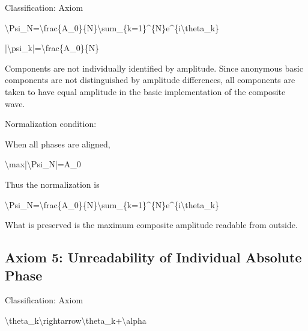 \documentclass[
  a4paper,
]{article}
\newenvironment{Shaded}{}{}
\newcommand{\NormalTok}[1]{#1}
\begin{document}
Classification: Axiom

\begin{Shaded}
\begin{Highlighting}[]
\NormalTok{\textbackslash{}Psi\_N=\textbackslash{}frac\{A\_0\}\{N\}\textbackslash{}sum\_\{k=1\}\^{}\{N\}e\^{}\{i\textbackslash{}theta\_k\}}
\end{Highlighting}
\end{Shaded}

\begin{Shaded}
\begin{Highlighting}[]
\NormalTok{|\textbackslash{}psi\_k|=\textbackslash{}frac\{A\_0\}\{N\}}
\end{Highlighting}
\end{Shaded}

Components are not individually identified by amplitude. Since anonymous
basic components are not distinguished by amplitude differences, all
components are taken to have equal amplitude in the basic implementation
of the composite wave.

Normalization condition:

When all phases are aligned,

\begin{Shaded}
\begin{Highlighting}[]
\NormalTok{\textbackslash{}max|\textbackslash{}Psi\_N|=A\_0}
\end{Highlighting}
\end{Shaded}

Thus the normalization is

\begin{Shaded}
\begin{Highlighting}[]
\NormalTok{\textbackslash{}Psi\_N=\textbackslash{}frac\{A\_0\}\{N\}\textbackslash{}sum\_\{k=1\}\^{}\{N\}e\^{}\{i\textbackslash{}theta\_k\}}
\end{Highlighting}
\end{Shaded}

What is preserved is the maximum composite amplitude readable from
outside.

\subsection{Axiom 5: Unreadability of Individual Absolute
Phase}\label{axiom-5-unreadability-of-individual-absolute-phase}

Classification: Axiom

\begin{Shaded}
\begin{Highlighting}[]
\NormalTok{\textbackslash{}theta\_k\textbackslash{}rightarrow\textbackslash{}theta\_k+\textbackslash{}alpha}
\end{Highlighting}
\end{Shaded}
\end{document}
